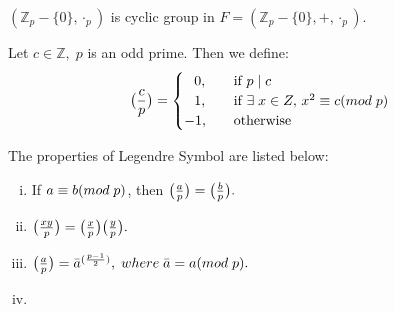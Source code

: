 \documentclass[10pt,a4paper]{article}
\begin{document}
\begin{corollary}
$(\mathbb{Z}_p-\{0\},\cdot_p)$ is cyclic group in $F=(\mathbb{Z}_p-\{0\},+,\cdot_p)$.
\end{corollary}

\begin{definition}
Let $c\in\mathbb{Z},\;p$ is an odd prime. Then we define:
\[   
\big(\frac{c}{p}\big) = 
     \begin{cases}	
       \;\;\,0, &\quad\text{if }p\mid c\\
       \;\;\,1, &\quad\text{if }\exists\;x\in{Z},\,x^2\equiv c(mod\;p) \\
      -1, &\quad\text{otherwise}\\ 
     \end{cases}
\]
\end{definition}


\begin{theorem}
The properties of Legendre Symbol are listed below:
\begin{enumerate}[i)]
\item If $a\equiv b(mod\;p)$, then $\big(\frac{a}{p}\big)=\big(\frac{b}{p}\big).$
\item $\big(\frac{xy}{p}\big)=\big(\frac{x}{p}\big)\big(\frac{y}{p}\big).$
\item $\big(\frac{a}{p}\big)={\bar{a}}^{(\frac{p-1}{2})},\;where\;\bar{a}=a(mod\;p).$
\item 
\end{enumerate}
\end{theorem}
\end{document}

